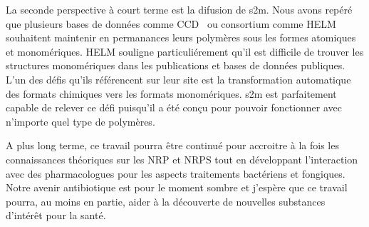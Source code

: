 La seconde perspective à court terme est la difusion de s2m.
Nous avons repéré que plusieurs bases de données comme CCD~\cite{rahman_small_2009} ou consortium comme HELM~\cite{_helm_????} souhaitent maintenir en permanances leurs polymères sous les formes atomiques et monomériques.
HELM souligne particuliérement qu'il est difficile de trouver les structures monomériques dans les publications et bases de données publiques.
L'un des défis qu'ils référencent sur leur site est la transformation automatique des formats chimiques vers les formats monomériques.
s2m est parfaitement capable de relever ce défi puisqu'il a été conçu pour pouvoir fonctionner avec n'importe quel type de polymères.

A plus long terme, ce travail pourra être continué pour accroitre à la fois les connaissances théoriques sur les NRP et NRPS tout en développant l'interaction avec des pharmacologues pour les aspects traitements bactériens et fongiques.
Notre avenir antibiotique est pour le moment sombre et j'espère que ce travail pourra, au moins en partie, aider à la découverte de nouvelles substances d'intérêt pour la santé.


























